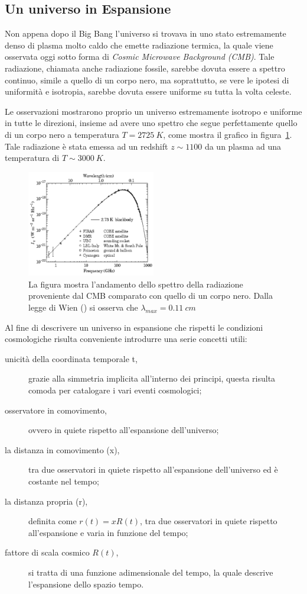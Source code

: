 \subsection{Un universo in Espansione}\label{sec:unverso-espansione}
Non appena dopo il Big Bang l'universo si trovava in uno stato estremamente denso di plasma molto caldo che emette radiazione termica, la quale viene osservata oggi sotto forma di \textit{Cosmic Microwave Background (CMB)}. Tale radiazione, chiamata anche radiazione fossile, sarebbe dovuta essere a spettro continuo, simile a quello di un corpo nero, ma soprattutto, se vere le ipotesi di uniformità e isotropia, sarebbe dovuta essere uniforme su tutta la volta celeste. 

Le osservazioni mostrarono proprio un universo estremamente isotropo e uniforme in tutte le direzioni, insieme ad avere uno spettro che segue perfettamente quello di un corpo nero a temperatura $T = \SI{2725}{K}$, come mostra il grafico in figura~\ref{fig:balckbody-universe}. Tale radiazione è stata emessa ad un redshift $z \sim 1100$ da un plasma ad una temperatura di $T \sim \SI{3000}{K}$.
\begin{figure}
    \centering
    \includegraphics[width = 0.5\textwidth]{immagini/blackbody-universe.png}
    \caption{La figura mostra l'andamento dello spettro della radiazione proveniente dal CMB comparato con quello di un corpo nero. Dalla legge di Wien () si osserva che $\lambda_{max}= \SI{0.11}{cm}$}\label{fig:balckbody-universe}
\end{figure}

Al fine di descrivere un universo in espansione che rispetti le condizioni cosmologiche risulta conveniente introdurre una serie concetti utili:
\begin{description}
    \item[unicità della coordinata temporale t,] grazie alla simmetria implicita all'interno dei principi, questa risulta comoda per catalogare i vari eventi cosmologici;
    \item[osservatore in comovimento,] ovvero in quiete rispetto all'espansione dell'universo;
    \item[la distanza in comovimento (x),] tra due osservatori in quiete rispetto all'espansione dell'universo ed è costante nel tempo;
    \item[la distanza propria (r),] definita come $r(t) = x R(t)$, tra due osservatori in quiete rispetto all'espansione e varia in funzione del tempo;
    \item[fattore di scala cosmico $R(t)$,] si tratta di una funzione adimensionale del tempo, la quale descrive l'espansione dello spazio tempo.
\end{description}

